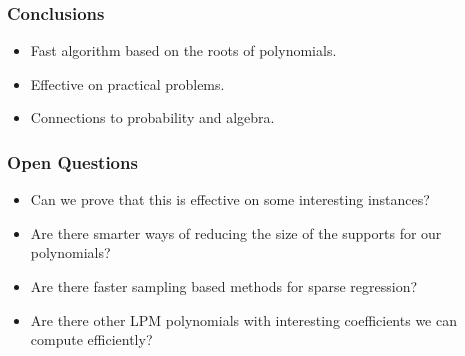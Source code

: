 \documentclass{beamer}
\begin{document}
\begin{frame}
    \frametitle{Conclusions}
    \begin{itemize}
        \item Fast algorithm based on the roots of polynomials.
        \item Effective on practical problems.
        \item Connections to probability and algebra.
    \end{itemize}
\end{frame}
\begin{frame}
    \frametitle{Open Questions}
    \begin{itemize}
        \item Can we prove that this is effective on some interesting instances?
        \item Are there smarter ways of reducing the size of the supports for our polynomials?
        \item Are there faster sampling based methods for sparse regression?
        \item Are there other LPM polynomials with interesting coefficients we can compute efficiently?
    \end{itemize}
    
\end{frame}
\end{document}
